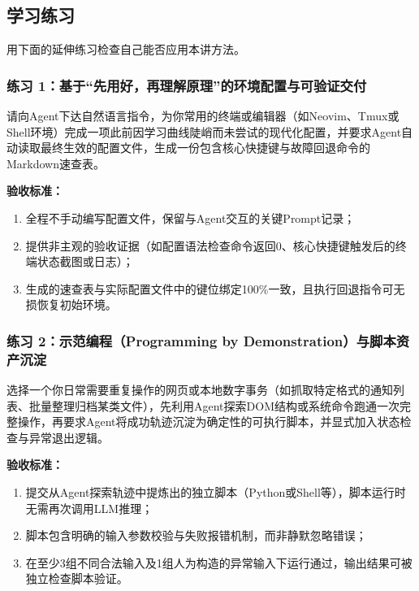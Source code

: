 \documentclass[UTF8,a4paper,11pt,fontset=fandol]{ctexart}
\begin{document}
\subsection{学习练习}

用下面的延伸练习检查自己能否应用本讲方法。

\subsubsection*{练习 1：基于“先用好，再理解原理”的环境配置与可验证交付}

请向Agent下达自然语言指令，为你常用的终端或编辑器（如Neovim、Tmux或Shell环境）完成一项此前因学习曲线陡峭而未尝试的现代化配置，并要求Agent自动读取最终生效的配置文件，生成一份包含核心快捷键与故障回退命令的Markdown速查表。

\par{}\textbf{验收标准：}

\begin{enumerate}
\item 全程不手动编写配置文件，保留与Agent交互的关键Prompt记录；

\item 提供非主观的验收证据（如配置语法检查命令返回0、核心快捷键触发后的终端状态截图或日志）；

\item 生成的速查表与实际配置文件中的键位绑定100\%一致，且执行回退指令可无损恢复初始环境。
\end{enumerate}

\subsubsection*{练习 2：示范编程（Programming by Demonstration）与脚本资产沉淀}

选择一个你日常需要重复操作的网页或本地数字事务（如抓取特定格式的通知列表、批量整理归档某类文件），先利用Agent探索DOM结构或系统命令跑通一次完整操作，再要求Agent将成功轨迹沉淀为确定性的可执行脚本，并显式加入状态检查与异常退出逻辑。

\par{}\textbf{验收标准：}

\begin{enumerate}
\item 提交从Agent探索轨迹中提炼出的独立脚本（Python或Shell等），脚本运行时无需再次调用LLM推理；

\item 脚本包含明确的输入参数校验与失败报错机制，而非静默忽略错误；

\item 在至少3组不同合法输入及1组人为构造的异常输入下运行通过，输出结果可被独立检查脚本验证。
\end{enumerate}
\end{document}

